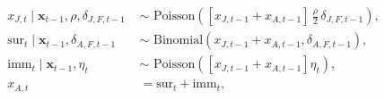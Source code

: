 \begin{equation}
  \begin{aligned}
    x_{J, t} \mid \boldsymbol{x}_{t - 1}, \rho, \delta_{J, F, t - 1}
    \,\, &\sim \,\,
    \text{Poisson}\left(
      \left[x_{J, t - 1} + x_{A, t - 1}\right]
      \, \frac{\rho}{2} \,
      \delta_{J, F, t - 1}
    \right), \\
    \text{sur}_{t} \mid \boldsymbol{x}_{t - 1}, \delta_{A, F, t - 1}
    \,\, &\sim \,\,
    \text{Binomial}\left(
      x_{J, t - 1} + x_{A, t - 1},
      \delta_{A, F, t - 1}
    \right), \\
    \text{imm}_{t} \mid \boldsymbol{x}_{t - 1}, \eta_{t}
    \,\, &\sim\,\,
    \text{Poisson}\left(
      \left[x_{J, t - 1} + x_{A, t - 1}\right] \eta_{t}\right
    ), \\
    x_{A, t} &= \text{sur}_{t} + \text{imm}_{t},
    \end{aligned}
  \label{eqn:count-data-submodel}
\end{equation}